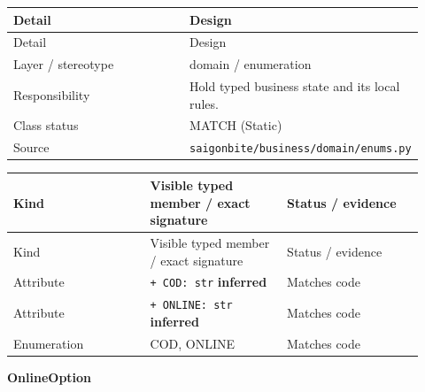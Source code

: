 \begin{longtable}{>{\raggedright\arraybackslash}p{0.4600\linewidth}>{\raggedright\arraybackslash}p{0.4600\linewidth}}
Detail & Design \\
\hline\endfirsthead
Detail & Design \\
\hline\endhead
Layer / stereotype & domain / \guillemotleft{}enumeration\guillemotright{} \\
Responsibility & Hold typed business state and its local rules. \\
Class status & MATCH (Static) \\
Source & \texttt{saigonbite/\allowbreak{}business/\allowbreak{}domain/\allowbreak{}enums.\allowbreak{}py} \\
\end{longtable}
\begin{longtable}{>{\raggedright\arraybackslash}p{0.3067\linewidth}>{\raggedright\arraybackslash}p{0.3067\linewidth}>{\raggedright\arraybackslash}p{0.3067\linewidth}}
Kind & Visible typed member / exact signature & Status / evidence \\
\hline\endfirsthead
Kind & Visible typed member / exact signature & Status / evidence \\
\hline\endhead
Attribute & \texttt{+ COD: str} \textbf{inferred} & Matches code \\
Attribute & \texttt{+ ONLINE: str} \textbf{inferred} & Matches code \\
Enumeration & COD, ONLINE & Matches code \\
\end{longtable}
\textbf{OnlineOption}

